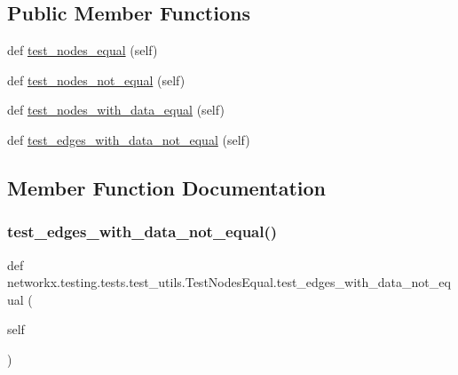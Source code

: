 \subsection*{Public Member Functions}
\begin{DoxyCompactItemize}
\item 
def \hyperlink{classnetworkx_1_1testing_1_1tests_1_1test__utils_1_1TestNodesEqual_a0b98263ff05e68a00f9eed4a4c727d26}{test\+\_\+nodes\+\_\+equal} (self)
\item 
def \hyperlink{classnetworkx_1_1testing_1_1tests_1_1test__utils_1_1TestNodesEqual_ae1ce8efb11a259163e0bded028d8f630}{test\+\_\+nodes\+\_\+not\+\_\+equal} (self)
\item 
def \hyperlink{classnetworkx_1_1testing_1_1tests_1_1test__utils_1_1TestNodesEqual_ab89e9e3aed66689edbd1260b51772d3d}{test\+\_\+nodes\+\_\+with\+\_\+data\+\_\+equal} (self)
\item 
def \hyperlink{classnetworkx_1_1testing_1_1tests_1_1test__utils_1_1TestNodesEqual_a77a7f6b840451cbe1592a084e451ad75}{test\+\_\+edges\+\_\+with\+\_\+data\+\_\+not\+\_\+equal} (self)
\end{DoxyCompactItemize}


\subsection{Member Function Documentation}
\mbox{\label{classnetworkx_1_1testing_1_1tests_1_1test__utils_1_1TestNodesEqual_a77a7f6b840451cbe1592a084e451ad75}} 
\subsubsection{\texorpdfstring{test\+\_\+edges\+\_\+with\+\_\+data\+\_\+not\+\_\+equal()}{test\_edges\_with\_data\_not\_equal()}}
{\footnotesize\ttfamily def networkx.\+testing.\+tests.\+test\+\_\+utils.\+Test\+Nodes\+Equal.\+test\+\_\+edges\+\_\+with\+\_\+data\+\_\+not\+\_\+equal (\begin{DoxyParamCaption}\item[{}]{self }\end{DoxyParamCaption})}

